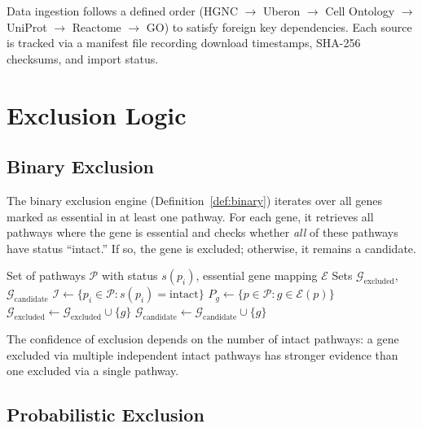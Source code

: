 \documentclass[12pt,a4paper]{article}
\begin{document}
Data ingestion follows a defined order (HGNC $\to$ Uberon $\to$ Cell Ontology $\to$ UniProt $\to$ Reactome $\to$ GO) to satisfy foreign key dependencies. Each source is tracked via a manifest file recording download timestamps, SHA-256 checksums, and import status.

\section{Exclusion Logic}
\label{sec:exclusion}

\subsection{Binary Exclusion}

The binary exclusion engine (Definition~\ref{def:binary}) iterates over all genes marked as essential in at least one pathway. For each gene, it retrieves all pathways where the gene is essential and checks whether \emph{all} of these pathways have status ``intact.'' If so, the gene is excluded; otherwise, it remains a candidate.

\begin{algorithm}[H]
\caption{Binary Exclusion Analysis}
\label{alg:binary}
\begin{algorithmic}[1]
\Require Set of pathways $\mathcal{P}$ with status $s(p_i)$, essential gene mapping $\mathcal{E}$
\Ensure Sets $\mathcal{G}_{\text{excluded}}$, $\mathcal{G}_{\text{candidate}}$
\State $\mathcal{I} \gets \{p_i \in \mathcal{P} : s(p_i) = \text{intact}\}$
 
    \State $P_g \gets \{p \in \mathcal{P} : g \in \mathcal{E}(p)\}$ 
        \State $\mathcal{G}_{\text{excluded}} \gets \mathcal{G}_{\text{excluded}} \cup \{g\}$
    \Else
        \State $\mathcal{G}_{\text{candidate}} \gets \mathcal{G}_{\text{candidate}} \cup \{g\}$
    \EndIf
\EndFor
\end{algorithmic}
\end{algorithm}

The confidence of exclusion depends on the number of intact pathways: a gene excluded via multiple independent intact pathways has stronger evidence than one excluded via a single pathway.

\subsection{Probabilistic Exclusion}
\end{document}
